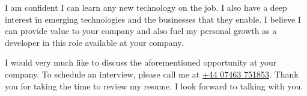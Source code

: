 \documentclass[11pt,a4paper,roman]{moderncv}
\begin{document}
\vspace{1em}
I am confident I can learn any new technology on the job. I also have a deep
interest in emerging technologies and the businesses that they enable.
I believe I can provide value to your company and also fuel my personal
growth as a developer in this role available at your company.

\vspace{1em}
I would very much like to discuss the aforementioned opportunity at your
company. To schedule an interview, please call me at \href{tel://+44 07463 751853}{+44 07463 751853}.
Thank you for taking the time to review my resume. I look forward to
talking with you.


\vspace{0.5cm}


\makeletterclosing
\end{document}
